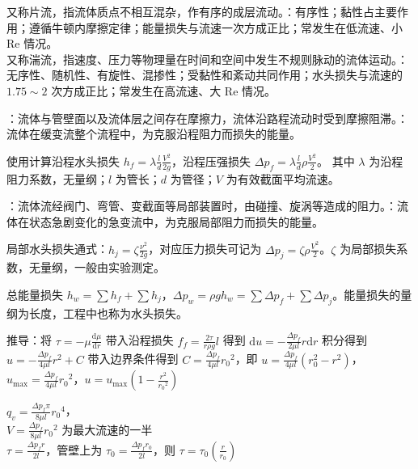 又称片流，指流体质点不相互混杂，作有序的成层流动。：有序性；黏性占主要作用；遵循牛顿内摩擦定律；能量损失与流速一次方成正比；常发生在低流速、小 $\mathrm{Re}$ 情况。\\
又称湍流，指速度、压力等物理量在时间和空间中发生不规则脉动的流体运动。：无序性、随机性、有旋性、混掺性；受黏性和紊动共同作用；水头损失与流速的 $1.75 \sim 2$ 次方成正比；常发生在高流速、大 $\mathrm{Re}$ 情况。

\divider


：流体与管壁面以及流体层之间存在摩擦力，流体沿路程流动时受到摩擦阻滞。：流体在缓变流整个流程中，为克服沿程阻力而损失的能量。

使用计算沿程水头损失 $h_f=\lambda \frac{l}{d}\frac{V^2}{2g}$，沿程压强损失 $\Delta p_f=\lambda \frac{l}{d}\rho\frac{V^2}{2}$。
其中 $\lambda$ 为沿程阻力系数，无量纲；$l$ 为管长；$d$ 为管径；$V$ 为有效截面平均流速。

：流体流经阀门、弯管、变截面等局部装置时，由碰撞、旋涡等造成的阻力。：流体在状态急剧变化的急变流中，为克服局部阻力而损失的能量。

局部水头损失通式：$h_j=\zeta \frac{\nu^2}{2g}$，对应压力损失可记为 $\Delta p_j=\zeta \rho \frac{V^2}{2}$。$\zeta$ 为局部损失系数，无量纲，一般由实验测定。

总能量损失 $h_w=\sum h_f+\sum h_j$，$\Delta p_w=\rho g h_w=\sum \Delta p_f+\sum \Delta p_j$。能量损失的量纲为长度，工程中也称为水头损失。

\divider


推导：将 $\tau = -\mu \frac{\mathrm{d}\mu}{\mathrm{d}r}$ 带入沿程损失 $f_f = \frac{2\tau}{r\rho g}l$ 得到 $\mathrm{d}u = -\frac{\Delta p_f}{2\mu l}r \mathrm{d}r$ 积分得到 $u = - \frac{\Delta p_f}{4\mu l}r^2+C$ 带入边界条件得到 $C = \frac{\Delta p_f}{4\mu l }{r_0}^2$，即 $u = \frac{\Delta p_f}{4\mu l}({r_0^2}-r^2)$，$u_\text{max}=\frac{\Delta p_f}{4\mu l}{r_0}^2$，$u = u_\text{max}\left(1-\frac{r^2}{{r_0}^2}\right)$

$q_v =\frac{\Delta p_f \pi}{8\mu l}{r_0}^4$，\\$V = \frac{\Delta p_f}{8\mu l}{r_0}^2$ 为最大流速的一半\\$\tau =\frac{\Delta p_f r}{2l}$，管壁上为 $\tau _0 =\frac{\Delta p_f r_0}{2l}$，则 $\tau = \tau_0\left(\frac{r}{r_0}\right)$

